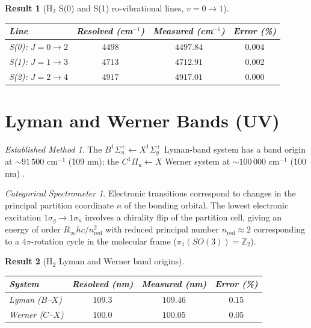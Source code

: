 \documentclass[11pt,a4paper]{article}
\theoremstyle{stmtstyle}
\newtheorem{result}{Result}
\theoremstyle{definition}
\theoremstyle{remark}
\newtheorem*{spectrometer}{Categorical Spectrometer}
\newtheorem*{established}{Established Method}
\begin{document}
\begin{result}[H$_{2}$ S(0) and S(1) ro-vibrational lines, $v=0\to 1$]\label{res:h2rovib}
\begin{center}\small
\begin{tabular}{lccc}
\toprule
Line & Resolved (cm$^{-1}$) & Measured (cm$^{-1}$) & Error (\%)\\
\midrule
S(0): $J=0\to 2$ & $4498$ & $4497.84$ & $0.004$\\
S(1): $J=1\to 3$ & $4713$ & $4712.91$ & $0.002$\\
S(2): $J=2\to 4$ & $4917$ & $4917.01$ & $0.000$\\
\bottomrule
\end{tabular}
\end{center}
\end{result}

\section{Lyman and Werner Bands (UV)}
\label{sec:h2uv}

\begin{established}
The $B^{1}\Sigma_{u}^{+}\leftarrow X^{1}\Sigma_{g}^{+}$ Lyman-band system has a band origin at $\sim 91\,500$ cm$^{-1}$ (109 nm); the $C^{1}\Pi_{u}\leftarrow X$ Werner system at $\sim 100\,000$ cm$^{-1}$ (100 nm) \citep{herzberg1950}.
\end{established}

\begin{spectrometer}
Electronic transitions correspond to changes in the principal partition coordinate $n$ of the bonding orbital. The lowest electronic excitation $1\sigma_{g}\to 1\sigma_{u}$ involves a chirality flip of the partition cell, giving an energy of order $R_{\infty} hc / n_{\mathrm{red}}^{2}$ with reduced principal number $n_{\mathrm{red}} \approx 2$ corresponding to a $4\pi$-rotation cycle in the molecular frame ($\pi_{1}(SO(3)) = \mathbb{Z}_{2}$).
\end{spectrometer}

\begin{result}[H$_{2}$ Lyman and Werner band origins]\label{res:h2uv}
\begin{center}\small
\begin{tabular}{lccc}
\toprule
System & Resolved (nm) & Measured (nm) & Error (\%)\\
\midrule
Lyman ($B$--$X$) & $109.3$ & $109.46$ & $0.15$\\
Werner ($C$--$X$) & $100.0$ & $100.05$ & $0.05$\\
\bottomrule
\end{tabular}
\end{center}
\end{result}
\end{document}
